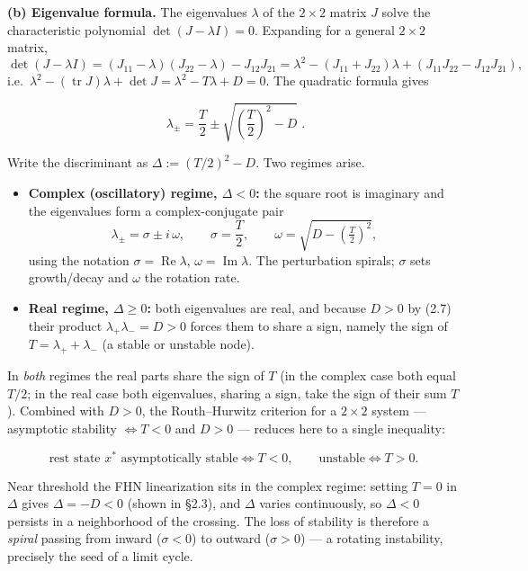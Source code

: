 \documentclass[
  11pt,
]{article}
\providecommand{\tightlist}{%
  \setlength{\itemsep}{0pt}\setlength{\parskip}{0pt}}
\providecommand{\lt}{<}
\providecommand{\gt}{>}
\begin{document}
\textbf{(b) Eigenvalue formula.} The eigenvalues \(\lambda\) of the
\(2\times2\) matrix \(J\) solve the characteristic polynomial
\(\det(J - \lambda I) = 0\). Expanding for a general \(2\times2\)
matrix, \[
\det(J-\lambda I) = (J_{11}-\lambda)(J_{22}-\lambda) - J_{12}J_{21}
= \lambda^2 - (J_{11}+J_{22})\lambda + (J_{11}J_{22}-J_{12}J_{21}),
\]
i.e.~\(\lambda^2 - (\operatorname{tr} J)\lambda + \det J = \lambda^2 - T\lambda + D = 0\).
The quadratic formula gives

\[
\boxed{\;\lambda_{\pm} = \frac{T}{2} \pm \sqrt{\left(\frac{T}{2}\right)^{2} - D}\;}.
\tag{2.8}
\]

Write the discriminant as \(\Delta := (T/2)^2 - D\). Two regimes arise.

\begin{itemize}
\tightlist
\item
  \textbf{Complex (oscillatory) regime, \(\Delta \lt  0\):} the square
  root is imaginary and the eigenvalues form a complex-conjugate pair \[
  \lambda_{\pm} = \sigma \pm i\,\omega, \qquad
  \sigma = \frac{T}{2}, \qquad
  \omega = \sqrt{D - \left(\tfrac{T}{2}\right)^2},
  \tag{2.9}
  \] using the notation \(\sigma = \operatorname{Re}\lambda\),
  \(\omega = \operatorname{Im}\lambda\). The perturbation spirals;
  \(\sigma\) sets growth/decay and \(\omega\) the rotation rate.
\item
  \textbf{Real regime, \(\Delta \ge 0\):} both eigenvalues are real, and
  because \(D\gt 0\) by (2.7) their product
  \(\lambda_+\lambda_- = D \gt  0\) forces them to share a sign, namely
  the sign of \(T = \lambda_+ + \lambda_-\) (a stable or unstable node).
\end{itemize}

In \emph{both} regimes the real parts share the sign of \(T\) (in the
complex case both equal \(T/2\); in the real case both eigenvalues,
sharing a sign, take the sign of their sum \(T\)). Combined with
\(D\gt 0\), the Routh--Hurwitz criterion for a \(2\times2\) system ---
asymptotic stability \(\iff T\lt 0\) and \(D\gt 0\) --- reduces here to
a single inequality:

\[
\text{rest state } x^* \text{ asymptotically stable} \iff T \lt  0, \qquad
\text{unstable} \iff T \gt  0.
\tag{2.10}
\]

Near threshold the FHN linearization sits in the complex regime: setting
\(T=0\) in \(\Delta\) gives \(\Delta = -D \lt  0\) (shown in §2.3), and
\(\Delta\) varies continuously, so \(\Delta\lt 0\) persists in a
neighborhood of the crossing. The loss of stability is therefore a
\emph{spiral} passing from inward (\(\sigma\lt 0\)) to outward
(\(\sigma\gt 0\)) --- a rotating instability, precisely the seed of a
limit cycle.
\end{document}

